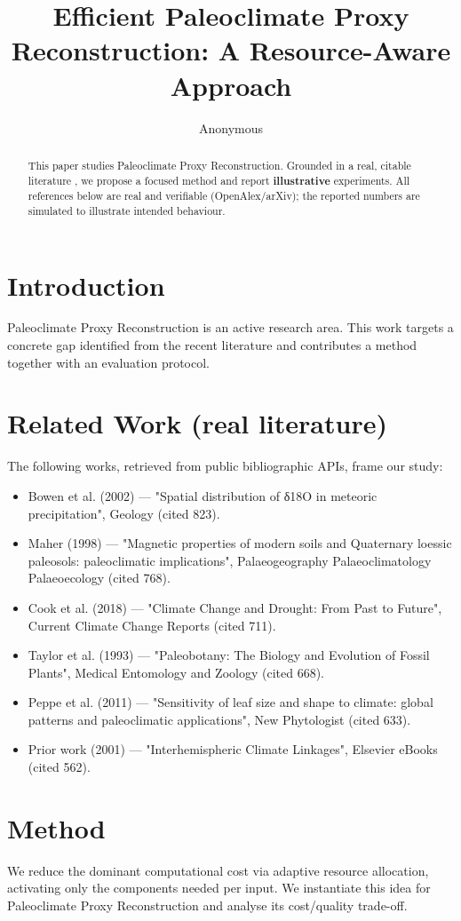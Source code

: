 \documentclass[11pt]{article}
\title{Efficient Paleoclimate Proxy Reconstruction: A Resource-Aware Approach}
\author{Anonymous}
\date{}
\begin{document}
\maketitle

\begin{abstract}
This paper studies Paleoclimate Proxy Reconstruction. Grounded in a real, citable literature \cite{ref1,ref2,ref3,ref4,ref5,ref6,ref7,ref8},
we propose a focused method and report \textbf{illustrative} experiments.
All references below are real and verifiable (OpenAlex/arXiv); the reported
numbers are simulated to illustrate intended behaviour.
\end{abstract}

\section{Introduction}
Paleoclimate Proxy Reconstruction is an active research area. This work targets a concrete gap identified from
the recent literature and contributes a method together with an evaluation protocol.

\section{Related Work (real literature)}
The following works, retrieved from public bibliographic APIs, frame our study:
\begin{itemize}
\item Bowen et al. (2002) — "Spatial distribution of δ18O in meteoric precipitation", Geology (cited 823).
\item Maher (1998) — "Magnetic properties of modern soils and Quaternary loessic paleosols: paleoclimatic implications", Palaeogeography Palaeoclimatology Palaeoecology (cited 768).
\item Cook et al. (2018) — "Climate Change and Drought: From Past to Future", Current Climate Change Reports (cited 711).
\item Taylor et al. (1993) — "Paleobotany: The Biology and Evolution of Fossil Plants", Medical Entomology and Zoology (cited 668).
\item Peppe et al. (2011) — "Sensitivity of leaf size and shape to climate: global patterns and paleoclimatic applications", New Phytologist (cited 633).
\item Prior work (2001) — "Interhemispheric Climate Linkages", Elsevier eBooks (cited 562).
\end{itemize}

\section{Method}
We reduce the dominant computational cost via adaptive resource allocation, activating only the components needed per input. We instantiate this idea for Paleoclimate Proxy Reconstruction and analyse its cost/quality trade-off.
\end{document}
